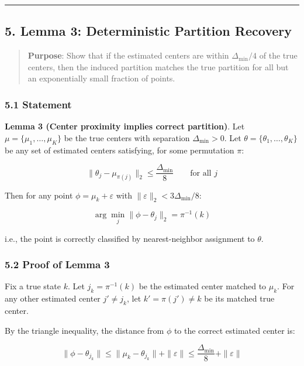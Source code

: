 \documentclass[
  12pt,
]{ctexart}
\begin{document}
\begin{center}\rule{0.5\linewidth}{0.5pt}\end{center}

\subsection{5. Lemma 3: Deterministic Partition
Recovery}\label{lemma-3-deterministic-partition-recovery}

\begin{quote}
\textbf{Purpose}: Show that if the estimated centers are within
\(\Delta_{\min}/4\) of the true centers, then the induced partition
matches the true partition for all but an exponentially small fraction
of points.
\end{quote}

\subsubsection{5.1 Statement}\label{statement-2}

\textbf{Lemma 3 (Center proximity implies correct partition)}. Let
\(\mu = \{\mu_1,\dots,\mu_K\}\) be the true centers with separation
\(\Delta_{\min} > 0\). Let \(\theta = \{\theta_1,\dots,\theta_K\}\) be
any set of estimated centers satisfying, for some permutation \(\pi\):

\[\|\theta_j - \mu_{\pi(j)}\|_2 \leq \frac{\Delta_{\min}}{8} \qquad \text{for all } j\]

Then for any point \(\phi = \mu_k + \varepsilon\) with
\(\|\varepsilon\|_2 < 3\Delta_{\min}/8\):

\[\arg \min_{j} \|\phi - \theta_j\|_2 = \pi^{-1}(k)\]

i.e., the point is correctly classified by nearest-neighbor assignment
to \(\theta\).

\subsubsection{5.2 Proof of Lemma 3}\label{proof-of-lemma-3}

Fix a true state \(k\). Let \(j_k = \pi^{-1}(k)\) be the estimated
center matched to \(\mu_k\). For any other estimated center
\(j' \neq j_k\), let \(k' = \pi(j') \neq k\) be its matched true center.

By the triangle inequality, the distance from \(\phi\) to the correct
estimated center is:

\[\|\phi - \theta_{j_k}\| \leq \|\mu_k - \theta_{j_k}\| + \|\varepsilon\| \leq \frac{\Delta_{\min}}{8} + \|\varepsilon\|\]
\end{document}
